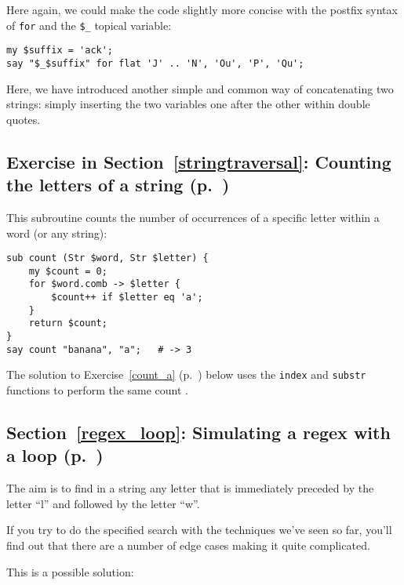 Here again, we could make the code slightly more concise with 
the postfix syntax of {\tt for} and the \verb'$_' topical 
variable:

\begin{verbatim}
my $suffix = 'ack';
say "$_$suffix" for flat 'J' .. 'N', 'Ou', 'P', 'Qu';
\end{verbatim}
%

Here, we have introduced another simple and common way of 
concatenating two strings: simply inserting the two variables one after the other within double quotes.


\subsection{Exercise in Section~\ref{stringtraversal}: Counting the letters of a string (p.~\pageref{stringtraversal})}
\label{sol_count_letters}

This subroutine counts the number of occurrences of 
a specific letter within a word (or any string):

\begin{verbatim}
sub count (Str $word, Str $letter) {
    my $count = 0;
    for $word.comb -> $letter {
        $count++ if $letter eq 'a';
    }
    return $count;   
}
say count "banana", "a";   # -> 3
\end{verbatim}
%

The solution to Exercise~\ref{count_a} 
(p.~\pageref{sol_count_a}) below uses the 
{\tt index} and {\tt substr} functions to perform 
the same count .


\subsection{Section~\ref{regex_loop}: Simulating a regex with a loop (p.~\pageref{regex_loop})}
\label{sol_regex_loop}

The aim is to find in a string any letter that is 
immediately preceded by the letter ``l'' and followed by 
the letter ``w''.

If you try to do the specified search with the techniques 
we've seen so far, you'll find out that there are a number 
of edge cases making it quite complicated.

This is a possible solution:


